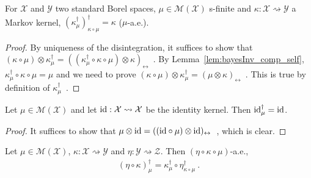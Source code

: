 \begin{lemma}
  \label{lem:bayesInv_self}
  For $\mathcal X$ and $\mathcal Y$ two standard Borel spaces, $\mu \in \mathcal M(\mathcal X)$ s-finite and $\kappa : \mathcal X \rightsquigarrow \mathcal Y$ a Markov kernel, $(\kappa_\mu^\dagger)_{\kappa \circ \mu}^\dagger = \kappa$ ($\mu$-a.e.).
\end{lemma}

\begin{proof}%
{}
By uniqueness of the disintegration, it suffices to show that $(\kappa \circ \mu) \otimes \kappa_\mu^\dagger = ((\kappa_\mu^\dagger \circ \kappa \circ \mu) \otimes \kappa)_\leftrightarrow$~.
By Lemma~\ref{lem:bayesInv_comp_self}, $\kappa_\mu^\dagger \circ \kappa \circ \mu = \mu$ and we need to prove $(\kappa \circ \mu) \otimes \kappa_\mu^\dagger = (\mu \otimes \kappa)_\leftrightarrow$~.
This is true by definition of $\kappa_\mu^\dagger$~.
\end{proof}

\begin{lemma}
  \label{lem:bayesInv_id}
  Let $\mu \in \mathcal M (\mathcal X)$ and let $\textup{id} : \mathcal X \rightsquigarrow \mathcal X$ be the identity kernel. Then $\textup{id}_\mu^\dagger = \textup{id}$.
\end{lemma}

\begin{proof}%
\uses{}
It suffices to show that $\mu \otimes \textup{id} = ((\textup{id} \circ \mu) \otimes \textup{id})_\leftrightarrow$~, which is clear.
\end{proof}

\begin{lemma}
  \label{lem:bayesInv_comp}
  Let $\mu \in \mathcal M(\mathcal X)$, $\kappa : \mathcal X \rightsquigarrow \mathcal Y$ and $\eta : \mathcal Y \rightsquigarrow \mathcal Z$. Then $(\eta \circ \kappa \circ \mu)$-a.e.,
  \begin{align*}
  (\eta \circ \kappa)_\mu^\dagger = \kappa_{\mu}^\dagger \circ \eta_{\kappa \circ \mu}^\dagger
  \: .
  \end{align*}
\end{lemma}

